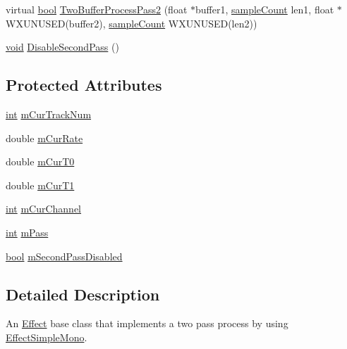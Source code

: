 \begin{DoxyCompactItemize}
\item 
virtual \hyperlink{mac_2config_2i386_2lib-src_2libsoxr_2soxr-config_8h_abb452686968e48b67397da5f97445f5b}{bool} \hyperlink{class_effect_two_pass_simple_mono_adc8d996222cad02c5bc0448ee19203b7}{Two\+Buffer\+Process\+Pass2} (float $\ast$buffer1, \hyperlink{include_2audacity_2_types_8h_afa427e1f521ea5ec12d054e8bd4d0f71}{sample\+Count} len1, float $\ast$W\+X\+U\+N\+U\+S\+ED(buffer2), \hyperlink{include_2audacity_2_types_8h_afa427e1f521ea5ec12d054e8bd4d0f71}{sample\+Count} W\+X\+U\+N\+U\+S\+ED(len2))
\item 
\hyperlink{sound_8c_ae35f5844602719cf66324f4de2a658b3}{void} \hyperlink{class_effect_two_pass_simple_mono_ab1852c285f0c00b3627683fa5e16e593}{Disable\+Second\+Pass} ()
\end{DoxyCompactItemize}
\subsection*{Protected Attributes}
\begin{DoxyCompactItemize}
\item 
\hyperlink{xmltok_8h_a5a0d4a5641ce434f1d23533f2b2e6653}{int} \hyperlink{class_effect_two_pass_simple_mono_a770ffe6dace72bac2af23410212d42b8}{m\+Cur\+Track\+Num}
\item 
double \hyperlink{class_effect_two_pass_simple_mono_a69e39749b514b947a31cb80068c4788e}{m\+Cur\+Rate}
\item 
double \hyperlink{class_effect_two_pass_simple_mono_a8aeacbef81efa1920a5c064776882521}{m\+Cur\+T0}
\item 
double \hyperlink{class_effect_two_pass_simple_mono_ac26d0c8dbefeeb1fb5395e19d23644fb}{m\+Cur\+T1}
\item 
\hyperlink{xmltok_8h_a5a0d4a5641ce434f1d23533f2b2e6653}{int} \hyperlink{class_effect_two_pass_simple_mono_a130a4d76f50159155601968d86f0014b}{m\+Cur\+Channel}
\item 
\hyperlink{xmltok_8h_a5a0d4a5641ce434f1d23533f2b2e6653}{int} \hyperlink{class_effect_two_pass_simple_mono_acacb66ebadd5b30fdec32ed28c150716}{m\+Pass}
\item 
\hyperlink{mac_2config_2i386_2lib-src_2libsoxr_2soxr-config_8h_abb452686968e48b67397da5f97445f5b}{bool} \hyperlink{class_effect_two_pass_simple_mono_a8e8f6872ffef564a7d58d979b96e73cf}{m\+Second\+Pass\+Disabled}
\end{DoxyCompactItemize}


\subsection{Detailed Description}
An \hyperlink{class_effect}{Effect} base class that implements a two pass process by using \hyperlink{class_effect_simple_mono}{Effect\+Simple\+Mono}. 

